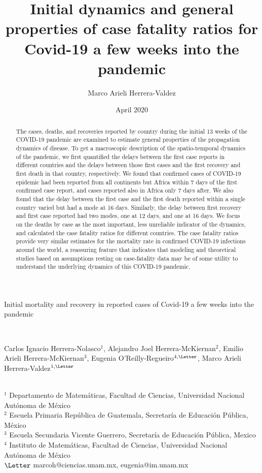 \documentclass[8pt]{article}
\title{Initial dynamics and general properties of case fatality ratios for Covid-19 a few weeks into the pandemic}
\author{Marco Arieli Herrera-Valdez}
\date{April 2020}
\begin{document}
%
\begin{flushleft}
\begin{Large}
{Initial mortality and recovery in reported cases of Covid-19 a few weeks into the pandemic}
\end{Large}\\
\smallskip
\begin{large}
Carlos Ignacio Herrera-Nolasco$^1$, Alejandro Joel Herrera-McKiernan$^2$, 
Emilio Arieli Herrera-McKiernan$^3$, Eugenia O'Reilly-Regueiro$^{4,\email}$,
Marco Arieli Herrera-Valdez$^{1,\email}$
\end{large}\\
\smallskip
$^1$ Departamento de Matemáticas, Facultad de Ciencias, Universidad Nacional Autónoma de México\\
$^2$ Escuela Primaria República de Guatemala, Secretaría de Educación Pública, México\\
$^3$ Escuela Secundaria Vicente Guerrero, Secretaría de Educación Pública, Mexico\\
$^4$ Instituto de Matemáticas, Facultad de Ciencias, Universidad Nacional Autónoma de México\\
$\email$ marcoh@ciencias.unam.mx, eugenia@im.unam.mx
\end{flushleft}

\begin{abstract} The cases, deaths, and recoveries reported by country during the initial 13 weeks of the COVID-19 pandemic are examined to estimate general properties of the propagation dynamics of disease. To get a macroscopic description of the spatio-temporal dynamics of the pandemic, we first quantified the delays between the first case reports in different countries and the delays between those first cases and the first recovery and first death in that country, respectively. We found that confirmed cases of COVID-19 epidemic had been reported from all continents but Africa within 7 days of the first confirmed case report, and cases reported also in Africa only 7 days after. We also found that the delay between the first case and the first death reported within a single country varied but had a mode at 16 days. Similarly, the delay between first  recovery and first case reported had two modes, one at 12 days, and one at 16 days. 
    We focus on the deaths by case as the most important, less unreliable indicator of the dynamics, and calculated the case fatality ratios for different countries. The case fatality ratios provide very similar estimates for the mortality rate in confirmed COVID-19 infections around the world, a reassuring feature that indicates that modeling and theoretical studies based on assumptions resting on case-fatality data may be of some utility to understand the underlying dynamics of this COVID-19 pandemic. 

\end{abstract}
\end{document}
